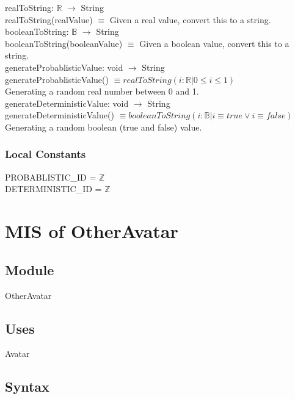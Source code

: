 \documentclass[12pt, titlepage]{article}
\begin{document}
\noindent realToString: $\mathbb{R}$  $\rightarrow$ String\\
realToString(realValue) $\equiv$ Given a real value, convert this to a string.  \\

\noindent booleanToString: $\mathbb{B}$  $\rightarrow$ String\\
booleanToString(booleanValue) $\equiv$ Given a boolean value, convert this to a string.  \\

\noindent generateProbablisticValue: void  $\rightarrow$ String\\
generateProbablisticValue() $\equiv realToString(i : \mathbb{R} | 0\le i \le 1) $  \\   
Generating a random real number between 0 and 1.\\

\noindent generateDeterministicValue: void  $\rightarrow$ String\\
generateDeterministicValue() $\equiv booleanToString(i : \mathbb{B} | i\equiv true \lor i\equiv false)$ \\
Generating a random boolean (true and false) value. \\

\subsubsection{Local Constants}
PROBABLISTIC\_ID = $\mathbb{Z}$\\
DETERMINISTIC\_ID = $\mathbb{Z}$\\

\newpage

\section{MIS of OtherAvatar} 


\subsection{Module}
OtherAvatar

\subsection{Uses}
Avatar


\subsection{Syntax}
\end{document}
